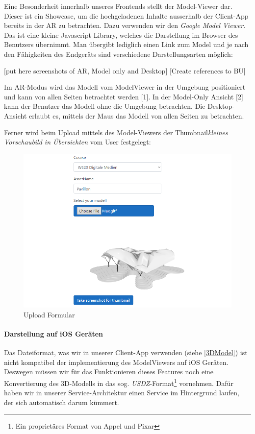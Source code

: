 \documentclass[titlepage, a4paper, 11pt]{scrartcl}
\begin{document}
          Eine Besonderheit innerhalb unseres Frontends stellt der Model-Viewer dar. Dieser ist ein Showcase, um die hochgeladenen Inhalte ausserhalb der Client-App bereits in der AR zu betrachten.
          Dazu verwenden wir den \textit{Google Model Viewer}\cite{ModelViewer:online}. Das ist eine kleine Javascript-Library, welches die Darstellung im Browser des Benutzers übernimmt.
          Man übergibt lediglich einen Link zum Model und je nach den Fähigkeiten des Endgeräts sind verschiedene Darstellungsarten möglich:

          [put here screenshots of AR, Model only and Desktop]
          [Create references to BU]

          Im AR-Modus wird das Modell vom ModelViewer in der Umgebung positioniert und kann von allen Seiten betrachtet werden [1]. 
          In der Model-Only Ansicht [2] kann der Benutzer das Modell ohne die Umgebung betrachten.
          Die Desktop-Ansicht erlaubt es, mittels der Maus das Modell von allen Seiten zu betrachten.

          Ferner wird beim Upload mittels des Model-Viewers der Thumbnail\textit{kleines Vorschaubild in Übersichten} vom User festgelegt:
          
          \begin{figure}[h]
            \centering
            \includegraphics[width=.6\textwidth]{UploadForm.PNG}
            \caption{Upload Formular}
            \label{createThumb}
          \end{figure}

        \paragraph{Darstellung auf iOS Geräten}

          Das Dateiformat, was wir in unserer Client-App verwenden (siehe \ref{3DModel}) ist nicht kompatibel der implementierung des ModelViewers auf iOS Geräten.
          Deswegen müssen wir für das Funktionieren dieses Features noch eine Konvertierung des 3D-Modells in das sog. \textit{USDZ}-Format\footnote{Ein proprietäres Format von Appel und Pixar} vornehmen.
          Dafür haben wir in unserer Service-Architektur einen Service im Hintergrund laufen, der sich automatisch darum kümmert.
\end{document}
